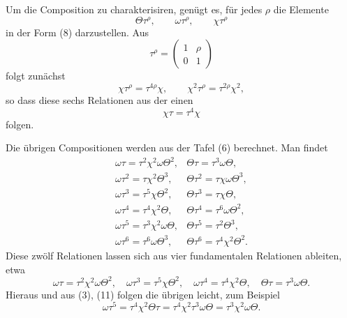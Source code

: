 \documentclass[11pt]{article}
\providecommand{\mat}[4]{\begin{pmatrix}#1&#2\\#3&#4\end{pmatrix}}
\providecommand{\mat}[4]{\begin{pmatrix}#1&#2\\#3&#4\end{pmatrix}}
\begin{document}
Um die Composition zu charakterisiren, genügt es, für jedes $\rho$ die Elemente
\begin{equation}
 \Theta\tau^\rho,
 \qquad \omega\tau^\rho,
 \qquad \chi\tau^\rho
 \tag{9}
\end{equation}
in der Form (8) darzustellen. Aus
\begin{equation}
 \tau^\rho=\mat{1}{\rho}{0}{1}
 \tag{10}
\end{equation}
folgt zunächst
\begin{equation}
 \chi\tau^\rho=\tau^{4\rho}\chi,
 \qquad
 \chi^2\tau^\rho=\tau^{2\rho}\chi^2,
 \tag{11}
\end{equation}
so dass diese sechs Relationen aus der einen
\begin{equation}
 \chi\tau=\tau^4\chi
 \tag{12}
\end{equation}
folgen.

Die übrigen Compositionen werden aus der Tafel (6) berechnet. Man findet
\begin{equation}
\begin{array}{ll}
 \omega\tau=\tau^2\chi^2\omega\Theta^2,&
 \Theta\tau=\tau^3\omega\Theta,\\
 \omega\tau^2=\tau\chi^2\Theta^3,&
 \Theta\tau^2=\tau\chi\omega\Theta^3,\\
 \omega\tau^3=\tau^5\chi\Theta^2,&
 \Theta\tau^3=\tau\chi\Theta,\\
 \omega\tau^4=\tau^4\chi^2\Theta,&
 \Theta\tau^4=\tau^6\omega\Theta^2,\\
 \omega\tau^5=\tau^3\chi^2\omega\Theta,&
 \Theta\tau^5=\tau^2\Theta^3,\\
 \omega\tau^6=\tau^6\omega\Theta^3,&
 \Theta\tau^6=\tau^4\chi^2\Theta^2.
\end{array}
\tag{13}
\end{equation}
Diese zwölf Relationen lassen sich aus vier fundamentalen Relationen ableiten, etwa
\begin{equation}
 \omega\tau=\tau^2\chi^2\omega\Theta^2,
 \quad \omega\tau^3=\tau^5\chi\Theta^2,
 \quad \omega\tau^4=\tau^4\chi^2\Theta,
 \quad \Theta\tau=\tau^3\omega\Theta.
 \tag{14}
\end{equation}
Hieraus und aus (3), (11) folgen die übrigen leicht, zum Beispiel
\[
 \omega\tau^5=\tau^4\chi^2\Theta\tau
 =\tau^4\chi^2\tau^3\omega\Theta
 =\tau^3\chi^2\omega\Theta.
\]
\end{document}
